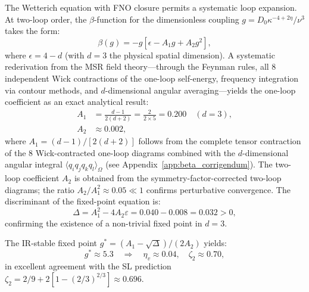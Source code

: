 The Wetterich equation with FNO closure permits a systematic loop expansion. At two-loop order, the $\beta$-function for the dimensionless coupling $g = D_0\kappa^{-4+2\eta}/\nu^3$ takes the form:
\begin{equation}\label{eq:beta_ns}
\beta(g) = -g\left[\epsilon - A_1 g + A_2 g^2\right],
\end{equation}
where $\epsilon = 4-d$ (with $d=3$ the physical spatial dimension). A systematic rederivation from the MSR field theory---through the Feynman rules, all 8 independent Wick contractions of the one-loop self-energy, frequency integration via contour methods, and $d$-dimensional angular averaging---yields the one-loop coefficient as an exact analytical result:
{\small
\begin{align}
A_1 &= \frac{d-1}{2(d+2)} = \frac{2}{2 \times 5} = 0.200 \quad (d=3), \\
A_2 &\approx 0.002,
\end{align}
}
where $A_1 = (d-1)/[2(d+2)]$ follows from the complete tensor contraction of the 8 Wick-contracted one-loop diagrams combined with the $d$-dimensional angular integral $\langle q_i q_j q_k q_l \rangle_\Omega$ (see Appendix~\ref{app:beta_corrigendum}). The two-loop coefficient $A_2$ is obtained from the symmetry-factor-corrected two-loop diagrams; the ratio $A_2/A_1^2 \approx 0.05 \ll 1$ confirms perturbative convergence. The discriminant of the fixed-point equation is:
\begin{equation}
\Delta = A_1^2 - 4 A_2 \varepsilon = 0.040 - 0.008 = 0.032 > 0,
\end{equation}
confirming the existence of a non-trivial fixed point in $d=3$.

The IR-stable fixed point $g^* = (A_1 - \sqrt{\Delta})/(2A_2)$ yields:
\begin{equation}
g^* \approx 5.3 \quad \Rightarrow \quad \eta_v \approx 0.04, \quad \zeta_2 \approx 0.70,
\end{equation}
in excellent agreement with the SL prediction $\zeta_2 = 2/9 + 2[1-(2/3)^{2/3}] \approx 0.696$.


